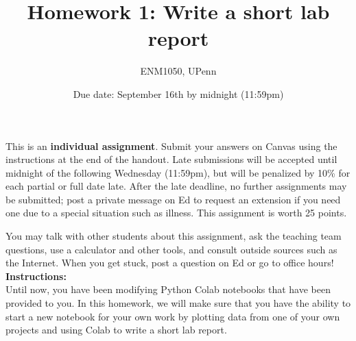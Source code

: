 \documentclass[12pt]{article}
\begin{document}
 
 
\title{Homework 1: Write a short lab report}
\author{ENM1050, UPenn}
\date{Due date: September 16th by midnight (11:59pm)}
\maketitle

This is an \textbf{individual assignment}. Submit your answers on Canvas using the instructions at the end of the handout. Late submissions will be accepted until midnight of the following Wednesday (11:59pm), but will be penalized by 10\% for each partial or full date late. After the late deadline, no further assignments may be submitted; post a private message on Ed to request an extension if you need one due to a special situation such as illness. This assignment is worth 25 points.

You may talk with other students about this assignment, ask the teaching team questions, use a calculator and other tools, and consult outside sources such as the Internet. When you get stuck, post a question on Ed or go to office hours!\\

\noindent \textbf{Instructions:}\\

\noindent Until now, you have been modifying Python Colab notebooks that have been provided to you. In this homework, we will make sure that you have the ability to start a new notebook for your own work by plotting data from one of your own projects and using Colab to write a short lab report.
\end{document}
